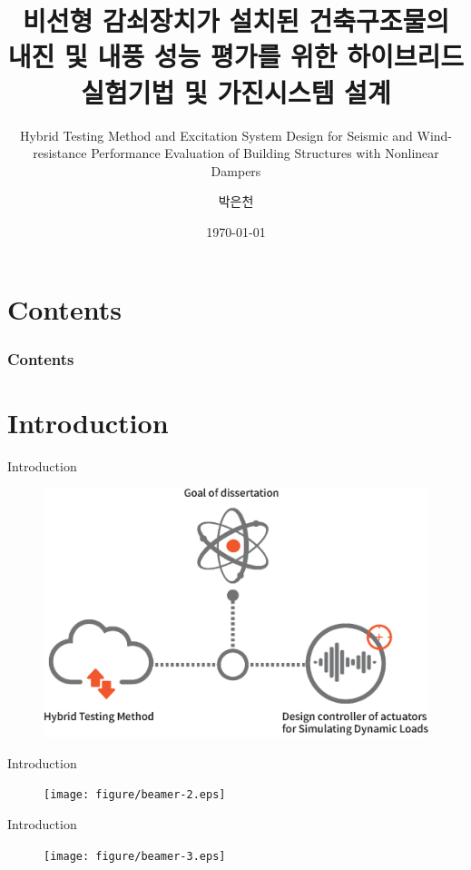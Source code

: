 \documentclass[usepdftitle=false]{beamer}
\title{비선형 감쇠장치가 설치된 건축구조물의 내진 및 내풍 성능 평가를 위한 하이브리드 실험기법 및 가진시스템 설계}
\subtitle{Hybrid Testing Method and Excitation System Design for Seismic and Wind-resistance Performance Evaluation of Building Structures with Nonlinear Dampers}
\author{박은천}
\institute{단국대학교 건축대학 {\Medium 지도교수 : 민경원}}
\date{\today}
\begin{document}
\maketitle

\section*{Contents}
\begin{frame}
	\frametitle{Contents}
	\tableofcontents[hideallsubsections]
\end{frame}

\section{Introduction}

\begin{frame}{Introduction}
\begin{figure}[ht]
\centering
\includegraphics[width=1\textwidth] {figure/beamer-1.eps}
\end{figure}
\end{frame}

\begin{frame}{Introduction}
\begin{figure}[ht]
\centering
\texttt{[image: figure/beamer-2.eps]}
\end{figure}
\end{frame}

\begin{frame}{Introduction}
\begin{figure}[ht]
\centering
\texttt{[image: figure/beamer-3.eps]}
\end{figure}
\end{frame}
\end{document}
